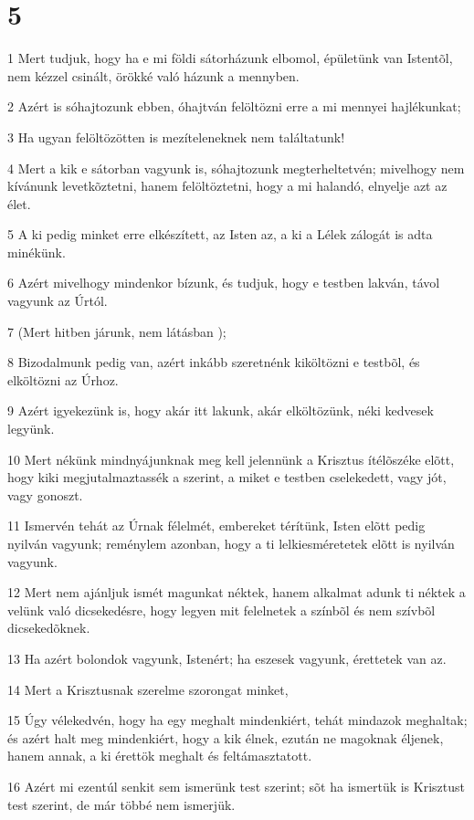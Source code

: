 \chapter{5}

\par 1 Mert tudjuk, hogy ha e mi földi sátorházunk elbomol, épületünk van Istentõl, nem kézzel csinált, örökké  való házunk a mennyben.
\par 2 Azért is sóhajtozunk ebben, óhajtván felöltözni erre a mi mennyei hajlékunkat;
\par 3 Ha ugyan felöltözötten is mezíteleneknek nem találtatunk!
\par 4 Mert a kik e sátorban vagyunk is, sóhajtozunk megterheltetvén; mivelhogy nem kívánunk levetkõztetni, hanem felöltöztetni, hogy a mi halandó, elnyelje azt az élet.
\par 5 A ki pedig minket erre elkészített, az Isten az, a ki a Lélek zálogát is adta minékünk.
\par 6 Azért mivelhogy mindenkor bízunk, és tudjuk, hogy e testben lakván, távol vagyunk az Úrtól.
\par 7 (Mert hitben járunk, nem látásban );
\par 8 Bizodalmunk pedig van, azért inkább szeretnénk kiköltözni e testbõl, és elköltözni az Úrhoz.
\par 9 Azért igyekezünk is, hogy akár itt lakunk, akár elköltözünk, néki kedvesek legyünk.
\par 10 Mert nékünk mindnyájunknak meg kell jelennünk a Krisztus ítélõszéke elõtt, hogy kiki megjutalmaztassék  a szerint, a miket e testben cselekedett, vagy jót, vagy gonoszt.
\par 11 Ismervén tehát az Úrnak félelmét, embereket térítünk,  Isten elõtt pedig nyilván vagyunk; reménylem azonban, hogy a ti lelkiesméretetek elõtt is nyilván vagyunk.
\par 12 Mert nem ajánljuk ismét magunkat néktek, hanem alkalmat adunk ti néktek a velünk való  dicsekedésre, hogy legyen mit felelnetek a színbõl és nem szívbõl dicsekedõknek.
\par 13 Ha azért bolondok vagyunk, Istenért; ha eszesek vagyunk, érettetek van az.
\par 14 Mert a Krisztusnak szerelme szorongat minket,
\par 15 Úgy vélekedvén, hogy ha egy meghalt mindenkiért, tehát mindazok meghaltak; és azért  halt meg mindenkiért, hogy a kik élnek, ezután ne magoknak éljenek, hanem annak, a ki érettök meghalt és feltámasztatott.
\par 16 Azért mi ezentúl senkit sem ismerünk test szerint; sõt ha ismertük is Krisztust test szerint, de már többé nem ismerjük.
